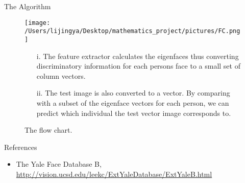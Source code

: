\documentclass[final]{beamer}
\newlength{\onecolwid}
\newcommand{\omitt}[1]{}
\begin{document}
\begin{frame}[t]
\begin{columns}[t]
\begin{column}{\onecolwid}
\begin{block}{The Algorithm}
\begin{figure}[h]
\centering
\texttt{[image: /Users/lijingya/Desktop/mathematics\_project/pictures/FC.png]}
\caption{ The flow chart.}
\begin{itemize}
\item[i.] The feature extractor calculates the eigenfaces thus converting discriminatory information for each persons face to a small set of column vectors. 
\item[ii.] The test image is also converted to a vector. By comparing with a subset of the eigenface vectors for each person, we can predict which individual the test vector image corresponds to.

\end{itemize}
\end{figure}

\end{block}

\vspace{-8mm}

\omitt{

\setbeamercolor{block title}{fg=red,bg=white} %

\begin{block}{Acknowledgements}

\end{block}

\vspace{-8mm}}


\begin{block}{References}
\begin{itemize}
\item The Yale Face Database B,\\ \url{http://vision.ucsd.edu/leekc/ExtYaleDatabase/ExtYaleB.html}
\end{itemize}


\end{block}

\end{column} %

\end{columns} %

\end{frame} %
\end{document}
